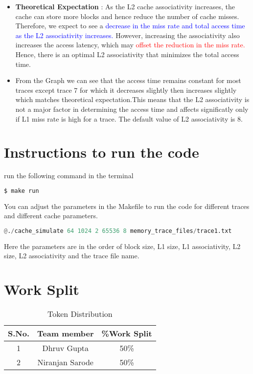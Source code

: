 \documentclass{article}
\begin{document}
\begin{itemize}
    \item  \textbf{Theoretical Expectation} : As the L2 cache associativity increases, the cache can store more blocks and hence reduce the number of cache misses. Therefore, we expect to see a \textcolor{blue}{ decrease in the miss rate and total access time as the L2 associativity increases.} However, increasing the associativity also increases the access latency, which may \textcolor{red}{ offset the reduction in the miss rate.} Hence, there is an optimal L2 associativity that minimizes the total access time.
    \item From the Graph we can see that the access time remains constant for most traces except trace 7 for which it decreases slightly then increases slightly which matches theoretical expectation.This means that the L2 associativity is not a major factor in determining the access time and affects significatly only if L1 miss rate is high for a trace. The default value of L2 associativity is 8.
\end{itemize}

\newpage

\section{Instructions to run the code}

run the following command in the terminal

\begin{lstlisting}[backgroundcolor = \color{light-gray},
    language = bash,
    xleftmargin = 0cm,
    framexleftmargin = 1em]
    $ make run
\end{lstlisting}

You can adjust the parameters in the Makefile to run the code for different traces and different cache parameters.
\begin{lstlisting}[backgroundcolor = \color{light-gray},
    language = python,
    xleftmargin = 0cm,
    framexleftmargin = 1em]
    @./cache_simulate 64 1024 2 65536 8 memory_trace_files/trace1.txt
\end{lstlisting}
Here the parameters are in the order of block size, L1 size, L1 associativity, L2 size, L2 associativity and the trace file name.


\section{Work Split}
\begin{table}[h]
    \centering
    \begin{tabular}{|c|c|c|}
    \hline
    \textbf{S.No.} & \textbf{Team member} & \textbf{\%Work Split} \\ \hline
    1              & Dhruv Gupta          & 50\%                  \\ \hline
    2              & Niranjan Sarode      & 50\%                  \\ \hline
    \end{tabular}
    \caption{Token Distribution}
    \label{tab:token-split}
    \end{table}
\end{document}

